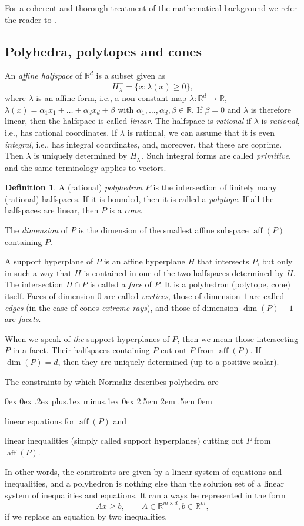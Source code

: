 \documentclass[12pt,a4paper]{scrartcl}
\newcounter{listi}
\newcommand{\stdli}{ \topsep0ex \partopsep0ex %
\parsep.2ex plus.1ex minus.1ex \itemsep0ex%
\leftmargin2.5em \labelwidth2em \labelsep.5em \rightmargin0em}%
\newenvironment{arab}{\begin{list}{\textup{(\arabic{listi})}}%
	{\usecounter{listi}\stdli}}{\end{list}}
\theoremstyle{definition}
\newtheorem{definition}[theorem]{Definition}
\def\RR{{\mathbb R}}
\DeclareMathOperator{\aff}{aff}
\begin{document}
For a coherent and thorough treatment of the mathematical background we refer the reader to \cite{BG}.

\subsection{Polyhedra, polytopes and cones}

An \emph{affine halfspace} of $\RR^d$ is a subset given as
$$
H_\lambda^+=\{x: \lambda(x)\ge 0\},
$$
where $\lambda$ is an affine form, i.e., a non-constant map $\lambda:\RR^d\to\RR$, $\lambda(x)=\alpha_1x_1+\dots+\alpha_dx_d+\beta$ with $\alpha_1,\dots,\alpha_d,\beta\in\RR$. If $\beta=0$ and $\lambda$ is therefore linear, then the halfspace is called \emph{linear}. The halfspace is \emph{rational} if $\lambda$ is \emph{rational},  i.e., has rational coordinates. If $\lambda$ is rational, we can assume that it is even \emph{integral}, i.e., has integral coordinates, and, moreover, that these are coprime. Then $\lambda$ is uniquely determined by $H_\lambda^+$. Such integral  forms are called \emph{primitive}, and the same terminology applies to vectors.

\begin{definition}
	A (rational) \emph{polyhedron} $P$ is the intersection of finitely many (rational) halfspaces. If it is bounded, then it is called a \emph{polytope}. If all the halfspaces are linear, then $P$ is a \emph{cone}.
	
	The \emph{dimension} of $P$ is the dimension of the smallest affine subspace $\aff(P)$ containing $P$.
\end{definition}


A support hyperplane of $P$ is an affine hyperplane $H$ that intersects $P$, but only in such a way that $H$ is contained in one of the two halfspaces determined by $H$. The intersection $H\cap P$ is called a \emph{face} of $P$. It is a polyhedron (polytope, cone) itself. Faces of dimension $0$ are called \emph{vertices}, those of dimension $1$ are called \emph{edges} (in the case of cones \emph{extreme rays}), and those of dimension $\dim(P)-1$ are \emph{facets}.

When we speak of \emph{the} support hyperplanes of $P$, then we mean those intersecting $P$ in a facet. Their halfspaces containing $P$ cut out $P$ from $\aff(P)$. If $\dim(P)=d$, then they are uniquely determined (up to a positive scalar).

The constraints by which Normaliz describes polyhedra are
\begin{arab}
	\item linear equations for $\aff(P)$ and
	\item linear inequalities (simply called support hyperplanes) cutting out $P$ from $\aff(P)$.
\end{arab}
In other words, the constraints are given by a linear system of equations and inequalities, and a polyhedron is nothing else than the solution set of a linear system of inequalities and equations. It can always be represented in the form
$$
Ax\ge b, \qquad A\in\RR^{m\times d}, b\in \RR^m,
$$
if we replace an equation by two inequalities.
\end{document}
